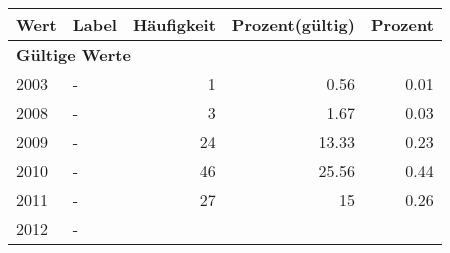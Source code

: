      \begin{longtable}{lXrrr}
     \toprule
     \textbf{Wert} & \textbf{Label} & \textbf{Häufigkeit} & \textbf{Prozent(gültig)} & \textbf{Prozent} \\
     \endhead
     \midrule
     \multicolumn{5}{l}{\textbf{Gültige Werte}}\\

     2003 &
     \multicolumn{1}{X}{ -  } &


       \num{1} &
       \num[round-mode=places,round-precision=2]{0,56} &
         \num[round-mode=places,round-precision=2]{0,01} \\

     2008 &
     \multicolumn{1}{X}{ -  } &


       \num{3} &
       \num[round-mode=places,round-precision=2]{1,67} &
         \num[round-mode=places,round-precision=2]{0,03} \\

     2009 &
     \multicolumn{1}{X}{ -  } &


       \num{24} &
       \num[round-mode=places,round-precision=2]{13,33} &
         \num[round-mode=places,round-precision=2]{0,23} \\

     2010 &
     \multicolumn{1}{X}{ -  } &


       \num{46} &
       \num[round-mode=places,round-precision=2]{25,56} &
         \num[round-mode=places,round-precision=2]{0,44} \\

     2011 &
     \multicolumn{1}{X}{ -  } &


       \num{27} &
       \num[round-mode=places,round-precision=2]{15} &
         \num[round-mode=places,round-precision=2]{0,26} \\

     2012 &
     \multicolumn{1}{X}{ -  } &



\end{longtable}
